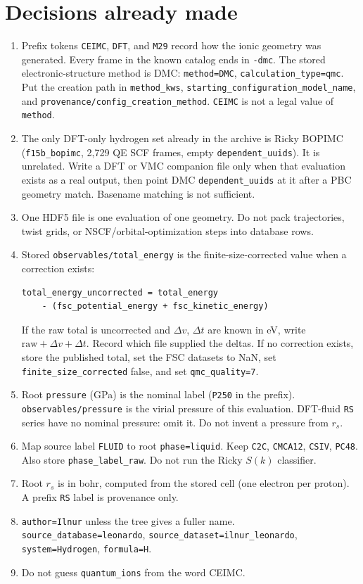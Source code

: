 \documentclass[11pt]{article}
\begin{document}
\section{Decisions already made}
\begin{enumerate}
\item Prefix tokens \texttt{CEIMC}, \texttt{DFT}, and \texttt{M29} record how
the ionic geometry was generated. Every frame in the known catalog ends in
\texttt{-dmc}. The stored electronic-structure method is DMC:
\texttt{method=DMC}, \texttt{calculation\_type=qmc}.
Put the creation path in \texttt{method\_kws},
\texttt{starting\_configuration\_model\_name}, and
\texttt{provenance/config\_creation\_method}.
\texttt{CEIMC} is not a legal value of \texttt{method}.
\item The only DFT-only hydrogen set already in the archive is Ricky BOPIMC
(\texttt{f15b\_bopimc}, 2{,}729 QE SCF frames, empty \texttt{dependent\_uuids}).
It is unrelated. Write a DFT or VMC companion file only when that evaluation
exists as a real output, then point DMC \texttt{dependent\_uuids} at it after
a PBC geometry match. Basename matching is not sufficient.
\item One HDF5 file is one evaluation of one geometry. Do not pack
trajectories, twist grids, or NSCF/orbital-optimization steps into database rows.
\item Stored \texttt{observables/total\_energy} is the finite-size-corrected
value when a correction exists:
\begin{verbatim}
total_energy_uncorrected = total_energy
    - (fsc_potential_energy + fsc_kinetic_energy)
\end{verbatim}
If the raw total is uncorrected and $\Delta v$, $\Delta t$ are known in eV,
write $\mathrm{raw}+\Delta v+\Delta t$. Record which file supplied the deltas.
If no correction exists, store the published total, set the FSC datasets to
NaN, set \texttt{finite\_size\_corrected} false, and set \texttt{qmc\_quality=7}.
\item Root \texttt{pressure} (GPa) is the nominal label (\texttt{P250} in the
prefix). \texttt{observables/pressure} is the virial pressure of this
evaluation. DFT-fluid \texttt{RS} series have no nominal pressure: omit it.
Do not invent a pressure from $r_s$.
\item Map source label \texttt{FLUID} to root \texttt{phase=liquid}. Keep
\texttt{C2C}, \texttt{CMCA12}, \texttt{CSIV}, \texttt{PC48}. Also store
\texttt{phase\_label\_raw}. Do not run the Ricky $S(k)$ classifier.
\item Root $r_s$ is in bohr, computed from the stored cell
(one electron per proton). A prefix \texttt{RS} label is provenance only.
\item \texttt{author=Ilnur} unless the tree gives a fuller name.
\texttt{source\_database=leonardo}, \texttt{source\_dataset=ilnur\_leonardo},
\texttt{system=Hydrogen}, \texttt{formula=H}.
\item Do not guess \texttt{quantum\_ions} from the word CEIMC.
\end{enumerate}
\end{document}
